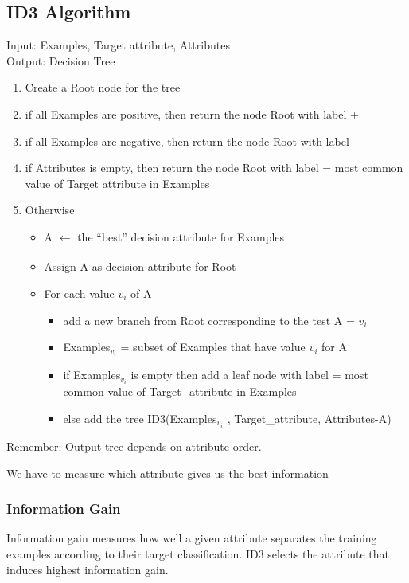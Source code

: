 \subsection{ID3 Algorithm}
Input: Examples, Target attribute, Attributes \\
Output: Decision Tree
\begin{enumerate}
    \item Create a Root node for the tree
    \item if all Examples are positive, then return the node Root with label +
    \item if all Examples are negative, then return the node Root with label -
    \item if Attributes is empty, then return the node Root with label = most common value of Target attribute in Examples
    \item Otherwise
    \begin{itemize}
        \item A $\xleftarrow[]{}$ the “best” decision attribute for Examples
        \item Assign A as decision attribute for Root
        \item For each value $v_{i}$ of A
         \begin{itemize}
             \item add a new branch from Root corresponding to the test A = $v_{i}$
             \item Examples$_{v_{i}}$ = subset of Examples that have value $v_{i}$ for A
             \item if Examples$_{v_{i}}$ is empty then add a leaf node with label = most common value of Target\_attribute in Examples
             \item else add the tree ID3(Examples$_{v_{i}}$ , Target\_{attribute}, Attributes-{A})
         \end{itemize}
    \end{itemize}
\end{enumerate}

Remember: Output tree depends on attribute order.

We have to measure which attribute gives us the best information

\subsubsection{Information Gain}
Information gain measures how well a given attribute separates the training examples according to their target classification. ID3 selects the attribute that induces highest information gain.

